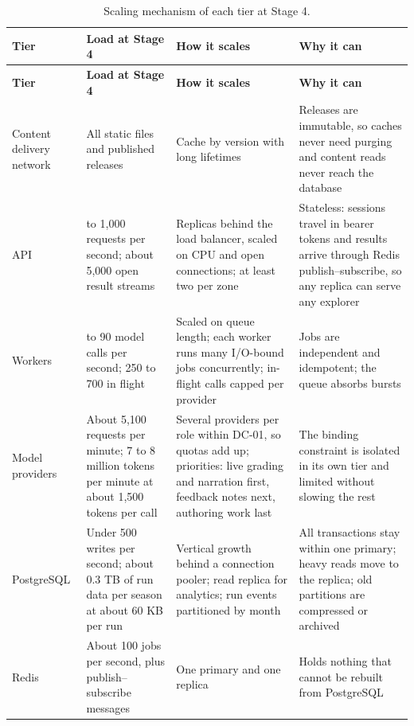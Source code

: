 {\small
\begin{longtable}{|>{\raggedright\arraybackslash}p{}|>{\raggedright\arraybackslash}p{}|>{\raggedright\arraybackslash}p{}|>{\raggedright\arraybackslash}p{}|}
\caption{Scaling mechanism of each tier at Stage 4.} \\
\hline
\textbf{Tier} & \textbf{Load at Stage 4} & \textbf{How it scales} & \textbf{Why it can} \\ \hline
\endfirsthead
\hline
\textbf{Tier} & \textbf{Load at Stage 4} & \textbf{How it scales} & \textbf{Why it can} \\ \hline
\endhead
Content delivery network & All static files and published releases & Cache by version with long lifetimes & Releases are immutable, so caches never need purging and content reads never reach the database \\ \hline
API & 500 to 1,000 requests per second; about 5,000 open result streams & Replicas behind the load balancer, scaled on CPU and open connections; at least two per zone & Stateless: sessions travel in bearer tokens and results arrive through Redis publish--subscribe, so any replica can serve any explorer \\ \hline
Workers & 80 to 90 model calls per second; 250 to 700 in flight & Scaled on queue length; each worker runs many I/O-bound jobs concurrently; in-flight calls capped per provider & Jobs are independent and idempotent; the queue absorbs bursts\cite{r168} \\ \hline
Model providers & About 5,100 requests per minute; 7 to 8 million tokens per minute at about 1,500 tokens per call & Several providers per role within DC-01, so quotas add up; priorities: live grading and narration first, feedback notes next, authoring work last & The binding constraint is isolated in its own tier and limited without slowing the rest \\ \hline
PostgreSQL & Under 500 writes per second; about 0.3 TB of run data per season at about 60 KB per run & Vertical growth behind a connection pooler; read replica for analytics; run events partitioned by month & All transactions stay within one primary; heavy reads move to the replica; old partitions are compressed or archived \\ \hline
Redis & About 100 jobs per second, plus publish--subscribe messages & One primary and one replica & Holds nothing that cannot be rebuilt from PostgreSQL \\ \hline
\end{longtable}
}

